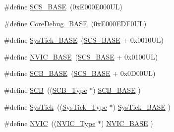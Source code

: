 \begin{DoxyCompactItemize}
\item 
\#define \hyperlink{group___c_m_s_i_s__core__register_ga3c14ed93192c8d9143322bbf77ebf770}{S\-C\-S\-\_\-\-B\-A\-S\-E}~(0x\-E000\-E000\-U\-L)
\item 
\#define \hyperlink{group___c_m_s_i_s__core__register_ga680604dbcda9e9b31a1639fcffe5230b}{Core\-Debug\-\_\-\-B\-A\-S\-E}~(0x\-E000\-E\-D\-F0\-U\-L)
\item 
\#define \hyperlink{group___c_m_s_i_s__core__register_ga58effaac0b93006b756d33209e814646}{Sys\-Tick\-\_\-\-B\-A\-S\-E}~(\hyperlink{group___c_m_s_i_s__core__register_ga3c14ed93192c8d9143322bbf77ebf770}{S\-C\-S\-\_\-\-B\-A\-S\-E} +  0x0010\-U\-L)
\item 
\#define \hyperlink{group___c_m_s_i_s__core__register_gaa0288691785a5f868238e0468b39523d}{N\-V\-I\-C\-\_\-\-B\-A\-S\-E}~(\hyperlink{group___c_m_s_i_s__core__register_ga3c14ed93192c8d9143322bbf77ebf770}{S\-C\-S\-\_\-\-B\-A\-S\-E} +  0x0100\-U\-L)
\item 
\#define \hyperlink{group___c_m_s_i_s__core__register_gad55a7ddb8d4b2398b0c1cfec76c0d9fd}{S\-C\-B\-\_\-\-B\-A\-S\-E}~(\hyperlink{group___c_m_s_i_s__core__register_ga3c14ed93192c8d9143322bbf77ebf770}{S\-C\-S\-\_\-\-B\-A\-S\-E} +  0x0\-D00\-U\-L)
\item 
\#define \hyperlink{group___c_m_s_i_s__core__register_gaaaf6477c2bde2f00f99e3c2fd1060b01}{S\-C\-B}~((\hyperlink{struct_s_c_b___type}{S\-C\-B\-\_\-\-Type}       $\ast$)     \hyperlink{group___c_m_s_i_s__core__register_gad55a7ddb8d4b2398b0c1cfec76c0d9fd}{S\-C\-B\-\_\-\-B\-A\-S\-E}      )
\item 
\#define \hyperlink{group___c_m_s_i_s__core__register_gacd96c53beeaff8f603fcda425eb295de}{Sys\-Tick}~((\hyperlink{struct_sys_tick___type}{Sys\-Tick\-\_\-\-Type}   $\ast$)     \hyperlink{group___c_m_s_i_s__core__register_ga58effaac0b93006b756d33209e814646}{Sys\-Tick\-\_\-\-B\-A\-S\-E}  )
\item 
\#define \hyperlink{group___c_m_s_i_s__core__register_gac8e97e8ce56ae9f57da1363a937f8a17}{N\-V\-I\-C}~((\hyperlink{struct_n_v_i_c___type}{N\-V\-I\-C\-\_\-\-Type}      $\ast$)     \hyperlink{group___c_m_s_i_s__core__register_gaa0288691785a5f868238e0468b39523d}{N\-V\-I\-C\-\_\-\-B\-A\-S\-E}     )
\end{DoxyCompactItemize}
